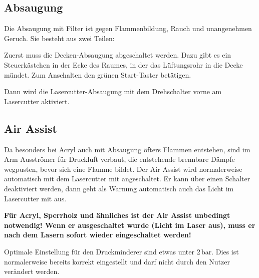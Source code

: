 \documentclass{\basedir/fablab-document}
\newcommand{\knopf}[2]{
    \begin{tikzpicture}[baseline={(box.base)}]
    \node [#1] (box) { 
        \fontsize{9pt}{9pt}\selectfont \textbf{#2}\strut
    };
    \end{tikzpicture}
}
\newcommand{\lueftungKnopf}[1]{\knopf{lueftungsknopf}{#1}}
\newcommand{\reflectboxX}[1]{\raisebox{\depth}{\scalebox{1}[-1]{#1}}} %
\newcommand{\returnSymbol}{\reflectboxX{\ensuremath{\mathbf{\Lsh}}}} %
\newcommand{\lueftungEnter}{\lueftungKnopf{\returnSymbol}}
\newcommand{\lueftungMinus}{\lueftungKnopf{-}}
\newcommand{\lueftungPlus}{\lueftungKnopf{+}}
\newcommand{\lueftungOn}{\lueftungKnopf{On}}
\newcommand{\lueftungOff}{\lueftungKnopf{Off}}
\begin{document}

\subsection{Absaugung}
\label{sec:absaugung}

Die Absaugung mit Filter ist gegen Flammenbildung, Rauch und unangenehmen Geruch. Sie besteht aus zwei Teilen:

Zuerst muss die Decken-Absaugung abgeschaltet werden. Dazu gibt es ein Steuerkästchen in der Ecke des Raumes, in der das Lüftungsrohr in die Decke mündet. Zum Anschalten den grünen Start-Taster betätigen.

Dann wird die Lasercutter-Absaugung mit dem Drehschalter vorne am Lasercutter aktiviert.


\pagebreak

\subsection{Air Assist}
\label{sec:air-assist}
Da besonders bei Acryl auch mit Absaugung öfters Flammen entstehen, sind im Arm Ausströmer für Druckluft verbaut, die entstehende brennbare Dämpfe wegpusten, bevor sich eine Flamme bildet. Der Air Assist wird normalerweise automatisch mit dem Lasercutter mit angeschaltet. Er kann über einen Schalter deaktiviert werden, dann geht als Warnung automatisch auch das Licht im Lasercutter mit aus.

\textbf{Für Acryl, Sperrholz und ähnliches ist der Air Assist unbedingt notwendig! Wenn er ausgeschaltet wurde (Licht im Laser aus), muss er nach dem Lasern sofort wieder eingeschaltet werden!}

Optimale Einstellung für den Druckminderer sind etwas unter 2\,bar. Dies ist normalerweise bereits korrekt eingestellt und darf nicht durch den Nutzer verändert werden.
\end{document}
